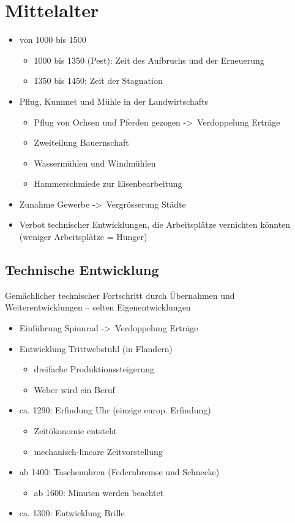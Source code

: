 \documentclass{report}
\begin{document}
\newpage

\section{Mittelalter}
\begin{itemize}
	\item von 1000 bis 1500
		\begin{itemize}
			\item 1000 bis 1350 (Pest): Zeit des Aufbruchs und der Erneuerung
			\item 1350 bis 1450: Zeit der Stagnation
		\end{itemize}
	\item Pflug, Kummet und Mühle in der Landwirtschafts
		\begin{itemize}
			\item Pflug von Ochsen und Pferden gezogen -\textgreater~Verdoppelung Erträge
			\item Zweiteilung Bauernschaft
			\item Wassermühlen und Windmühlen
			\item Hammerschmiede zur Eisenbearbeitung
		\end{itemize}
	\item Zunahme Gewerbe -\textgreater~Vergrösserung Städte
	\item Verbot technischer Entwicklungen, die Arbeitsplätze vernichten könnten\\(weniger Arbeitsplätze = Hunger)
\end{itemize}

\subsection{Technische Entwicklung}
Gemächlicher technischer Fortschritt durch Übernahmen und Weiterentwicklungen – selten Eigenentwicklungen
\begin{itemize}
	\item Einführung Spinnrad -\textgreater~Verdoppelung Erträge
	\item Entwicklung Trittwebstuhl (in Flandern)
		\begin{itemize}
			\item dreifache Produktionssteigerung 
			\item Weber wird ein Beruf
		\end{itemize}
	\item ca. 1290: Erfindung Uhr (einzige europ. Erfindung)
		\begin{itemize}
			\item Zeitökonomie entsteht
			\item mechanisch-lineare Zeitvorstellung
		\end{itemize}
	\item ab 1400: Taschenuhren (Federnbremse und Schnecke)
		\begin{itemize}
			\item ab 1600: Minuten werden beachtet
		\end{itemize}
	\item ca. 1300: Entwicklung Brille
\end{itemize}
\end{document}
